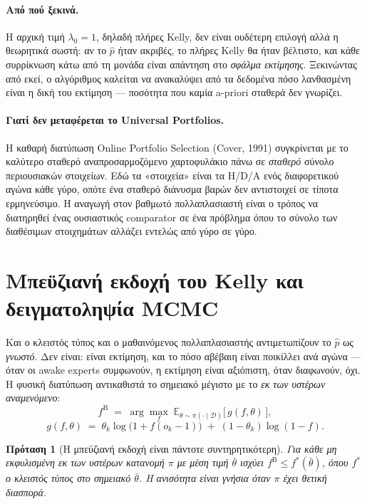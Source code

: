 \documentclass[12pt,a4paper,oneside]{report}
\newcommand{\en}[1]{\textenglish{#1}}
\renewcommand{\_}{\oldunderscore\allowbreak}
\theoremstyle{definition}
\theoremstyle{plain}
\newtheorem{proposition}[theorem]{Πρόταση}
\theoremstyle{remark}
\begin{document}
\paragraph{Από πού ξεκινά.} Η αρχική τιμή $\lambda_0 = 1$, δηλαδή πλήρες Kelly, δεν είναι
ουδέτερη επιλογή αλλά η θεωρητικά σωστή: αν το $\hat{p}$ ήταν ακριβές, το πλήρες Kelly θα
ήταν βέλτιστο, και κάθε συρρίκνωση κάτω από τη μονάδα είναι απάντηση στο \emph{σφάλμα
εκτίμησης}. Ξεκινώντας από εκεί, ο αλγόριθμος καλείται να ανακαλύψει από τα δεδομένα πόσο
λανθασμένη είναι η δική του εκτίμηση --- ποσότητα που καμία a-priori σταθερά δεν γνωρίζει.

\paragraph{Γιατί δεν μεταφέρεται το Universal Portfolios.} Η καθαρή διατύπωση
\en{Online Portfolio Selection} (Cover, 1991) συγκρίνεται με το καλύτερο σταθερό
αναπροσαρμοζόμενο χαρτοφυλάκιο πάνω σε \emph{σταθερό} σύνολο περιουσιακών στοιχείων. Εδώ τα
«στοιχεία» είναι τα H/D/A ενός διαφορετικού αγώνα κάθε γύρο, οπότε ένα σταθερό διάνυσμα
βαρών δεν αντιστοιχεί σε τίποτα ερμηνεύσιμο. Η αναγωγή στον βαθμωτό πολλαπλασιαστή είναι ο
τρόπος να διατηρηθεί ένας ουσιαστικός comparator σε ένα πρόβλημα όπου το σύνολο των
διαθέσιμων στοιχημάτων αλλάζει εντελώς από γύρο σε γύρο.

\section{Μπεϋζιανή εκδοχή του Kelly και δειγματοληψία MCMC}
\label{sec:mcmc-theory}

Και ο κλειστός τύπος και ο μαθαινόμενος πολλαπλασιαστής αντιμετωπίζουν το $\hat{p}$ ως
\emph{γνωστό}. Δεν είναι: είναι εκτίμηση, και το πόσο αβέβαιη είναι ποικίλλει ανά αγώνα ---
όταν οι awake experts συμφωνούν, η εκτίμηση είναι αξιόπιστη, όταν διαφωνούν, όχι. Η φυσική
διατύπωση αντικαθιστά το σημειακό μέγιστο με το \emph{εκ των υστέρων αναμενόμενο}:
\[
f^{\mathrm{B}} \;=\; \arg\max_{f} \; \mathbb{E}_{\theta \sim \pi(\cdot\mid\mathcal{D})}
\big[\, g(f,\theta) \,\big],
\]
\[
g(f,\theta) \;=\; \theta_k \log\big(1+f(o_k-1)\big) \;+\; (1-\theta_k)\log(1-f).
\]

\begin{proposition}[Η μπεϋζιανή εκδοχή είναι πάντοτε συντηρητικότερη]
\label{prop:bayes-conservative}
Για κάθε μη εκφυλισμένη εκ των υστέρων κατανομή $\pi$ με μέση τιμή $\bar{\theta}$ ισχύει
$f^{\mathrm{B}} \leq f^{*}(\bar{\theta})$, όπου $f^{*}$ ο κλειστός τύπος στο σημειακό
$\bar{\theta}$. Η ανισότητα είναι γνήσια όταν $\pi$ έχει θετική διασπορά.
\end{proposition}
\end{document}
